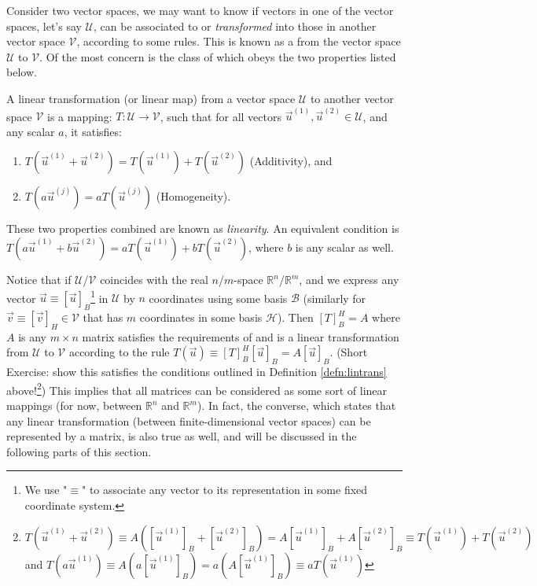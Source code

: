 Consider two vector spaces, we may want to know if vectors in one of the vector spaces, let's say $\mathcal{U}$, can be associated to or \textit{transformed} into those in another vector space $\mathcal{V}$, according to some rules. This is known as a  from the vector space $\mathcal{U}$ to $\mathcal{V}$. Of the most concern is the class of  which obeys the two properties listed below.
\begin{defn}
\label{defn:lintrans}
A linear transformation (or linear map) from a vector space $\mathcal{U}$ to another vector space $\mathcal{V}$ is a mapping: $T: \mathcal{U} \to \mathcal{V}$, such that for all vectors $\vec{u}^{(1)}, \vec{u}^{(2)} \in \mathcal{U}$, and any scalar $a$, it satisfies:
\begin{enumerate}
    \item $T(\vec{u}^{(1)} + \vec{u}^{(2)}) = T(\vec{u}^{(1)}) + T(\vec{u}^{(2)})$ (Additivity), and
    \item $T(a\vec{u}^{(j)}) = aT(\vec{u}^{(j)})$ (Homogeneity).
\end{enumerate}
These two properties combined are known as \textit{linearity}. An equivalent condition is $T(a\vec{u}^{(1)} + b\vec{u}^{(2)}) = aT(\vec{u}^{(1)}) + bT(\vec{u}^{(2)})$, where $b$ is any scalar as well.
\end{defn}
Notice that if $\mathcal{U}$/$\mathcal{V}$ coincides with the real $n$/$m$-space $\mathbb{R}^n$/$\mathbb{R}^m$, and we express any vector $\vec{u} \equiv [\vec{u}]_B$\footnote{We use "$\equiv$" to associate any vector to its representation in some fixed coordinate system.} in $\mathcal{U}$ by $n$ coordinates using some basis $\mathcal{B}$ (similarly for $\vec{v} \equiv [\vec{v}]_{H} \in \mathcal{V}$ that has $m$ coordinates in some basis $\mathcal{H}$). Then $[T]_B^{H} = A$ where $A$ is any $m \times n$ matrix satisfies the requirements of and is a linear transformation from $\mathcal{U}$ to $\mathcal{V}$ according to the rule $T(\vec{u}) \equiv [T]_B^{H}[\vec{u}]_B = A[\vec{u}]_B$. (Short Exercise: show this satisfies the conditions outlined in Definition \ref{defn:lintrans} above!\footnote{$T(\vec{u}^{(1)}+\vec{u}^{(2)}) \equiv A([\vec{u}^{(1)}]_B + [\vec{u}^{(2)}]_B) = A[\vec{u}^{(1)}]_B + A[\vec{u}^{(2)}]_B \equiv T(\vec{u}^{(1)})+T(\vec{u}^{(2)})$ and $T(a\vec{u}^{(1)}) \equiv A(a[\vec{u}^{(1)}]_B) = a(A[\vec{u}^{(1)}]_B) \equiv aT(\vec{u}^{(1)})$}) This implies that all matrices can be considered as some sort of linear mappings (for now, between $\mathbb{R}^n$ and $\mathbb{R}^m$). In fact, the converse, which states that any linear transformation (between finite-dimensional vector spaces) can be represented by a matrix, is also true as well, and will be discussed in the following parts of this section.\\
